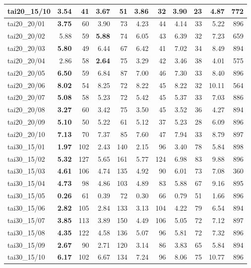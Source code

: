 \begin{longtable}{l | rr | rr | rr | rr | rr}
tai20_15/10    & \textbf{3.54} & 41 & 3.67 & 51 & 3.86 & 32 & 3.90 & 23 & 4.87 & 772 \\
\hline
tai20_20/01    & \textbf{3.75} & 60 & 3.90 & 73 & 4.23 & 44 & 4.14 & 33 & 5.22 & 896 \\
tai20_20/02    & 5.88 & 59 & \textbf{5.88} & 74 & 6.05 & 43 & 6.39 & 32 & 7.23 & 659 \\
tai20_20/03    & \textbf{5.80} & 49 & 6.44 & 67 & 6.42 & 41 & 7.02 & 34 & 8.49 & 894 \\
tai20_20/04    & 2.86 & 58 & \textbf{2.64} & 75 & 3.29 & 42 & 3.46 & 38 & 4.01 & 575 \\
tai20_20/05    & \textbf{6.50} & 59 & 6.84 & 87 & 7.00 & 46 & 7.30 & 33 & 8.40 & 896 \\
tai20_20/06    & \textbf{8.02} & 54 & 8.25 & 72 & 8.22 & 45 & 8.22 & 32 & 10.11 & 564 \\
tai20_20/07    & \textbf{5.08} & 58 & 5.23 & 72 & 5.42 & 45 & 5.37 & 33 & 7.03 & 886 \\
tai20_20/08    & \textbf{3.27} & 60 & 3.42 & 75 & 3.50 & 45 & 3.52 & 36 & 4.27 & 894 \\
tai20_20/09    & \textbf{5.10} & 50 & 5.22 & 61 & 5.12 & 37 & 5.23 & 28 & 6.09 & 896 \\
tai20_20/10    & \textbf{7.13} & 70 & 7.37 & 85 & 7.60 & 47 & 7.94 & 33 & 8.79 & 897 \\
\hline
tai30_15/01    & \textbf{1.97} & 102 & 2.43 & 140 & 2.15 & 96 & 3.40 & 78 & 5.84 & 898 \\
tai30_15/02    & \textbf{5.32} & 127 & 5.65 & 161 & 5.77 & 124 & 6.98 & 83 & 9.88 & 896 \\
tai30_15/03    & \textbf{4.61} & 106 & 4.74 & 135 & 4.92 & 90 & 6.01 & 73 & 7.08 & 360 \\
tai30_15/04    & \textbf{4.73} & 98 & 4.86 & 103 & 4.89 & 83 & 5.88 & 67 & 9.16 & 895 \\
tai30_15/05    & \textbf{0.26} & 61 & 0.39 & 72 & 0.30 & 66 & 0.79 & 51 & 1.66 & 896 \\
tai30_15/06    & \textbf{2.82} & 105 & 2.84 & 133 & 3.13 & 104 & 4.22 & 79 & 6.54 & 894 \\
tai30_15/07    & \textbf{3.85} & 113 & 3.89 & 150 & 4.49 & 106 & 5.05 & 72 & 7.12 & 897 \\
tai30_15/08    & \textbf{4.35} & 122 & 4.58 & 136 & 5.07 & 96 & 5.81 & 72 & 7.32 & 896 \\
tai30_15/09    & \textbf{2.67} & 90 & 2.71 & 120 & 3.14 & 86 & 3.83 & 65 & 5.84 & 894 \\
tai30_15/10    & \textbf{6.17} & 102 & 6.67 & 134 & 7.24 & 96 & 8.06 & 75 & 10.77 & 896 \\

\end{longtable}
